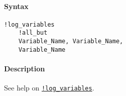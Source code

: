 


	\paragraph{Syntax}

\begin{verbatim}
!log_variables
    !all_but
    Variable_Name, Variable_Name, 
    Variable_Name
\end{verbatim}

\paragraph{Description}

See help on \href{modellang/logvariables}{\texttt{!log\_variables}}.


